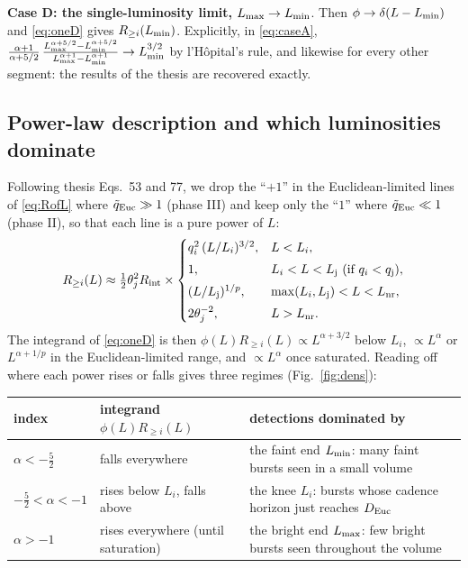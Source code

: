 \documentclass[11pt,a4paper]{article}
\newcommand{\tq}{\tilde{q}}
\newcommand{\Euc}{{\rm Euc}}
\newcommand{\Rint}{R_{\rm int}}
\newcommand{\Lmin}{L_{\rm min}}
\newcommand{\Lmax}{L_{\rm max}}
\newcommand{\Lj}{L_{\rm j}}
\newcommand{\Lnr}{L_{\rm nr}}
\begin{document}
\medskip\noindent\textbf{Case D: the single-luminosity limit,} $\Lmax\to\Lmin$. Then $\phi\to\delta(L-\Lmin)$ and \eqref{eq:oneD} gives $R_{\geq i}(\Lmin)$. Explicitly, in \eqref{eq:caseA}, $\frac{\alpha+1}{\alpha+5/2}\,\frac{\Lmax^{\alpha+5/2}-\Lmin^{\alpha+5/2}}{\Lmax^{\alpha+1}-\Lmin^{\alpha+1}}\to\Lmin^{3/2}$ by l'H\^opital's rule, and likewise for every other segment: the results of the thesis are recovered exactly.

\subsection{Power-law description and which luminosities dominate}
\label{sec:dominance}

Following thesis Eqs.~53 and 77, we drop the ``$+1$'' in the Euclidean-limited lines of \eqref{eq:RofL} where $\tq_\Euc\gg1$ (phase III) and keep only the ``$1$'' where $\tq_\Euc\ll1$ (phase II), so that each line is a pure power of $L$:
\begin{equation}
\label{eq:RofLpow}
R_{\geq i}(L)\approx\tfrac12\theta_j^2\Rint\times\begin{cases}
q_i^2\,(L/L_i)^{3/2}, & L<L_i,\\[3pt]
1, & L_i<L<\Lj\ (\text{if }q_i<q_{\rm j}),\\[3pt]
(L/\Lj)^{1/p}, & \max(L_i,\Lj)<L<\Lnr,\\[3pt]
2\theta_j^{-2}, & L>\Lnr .
\end{cases}
\end{equation}
The integrand of \eqref{eq:oneD} is then $\phi(L)R_{\geq i}(L)\propto L^{\alpha+3/2}$ below $L_i$, $\propto L^{\alpha}$ or $L^{\alpha+1/p}$ in the Euclidean-limited range, and $\propto L^{\alpha}$ once saturated. Reading off where each power rises or falls gives three regimes (Fig.~\ref{fig:dens}):

\begin{center}\small
\renewcommand{\arraystretch}{1.35}
\begin{tabular}{l l p{7.6cm}}
\toprule
index & integrand $\phi(L)R_{\geq i}(L)$ & detections dominated by \\
\midrule
$\alpha<-\tfrac52$ & falls everywhere & the faint end $\Lmin$: many faint bursts seen in a small volume \\
$-\tfrac52<\alpha<-1$ & rises below $L_i$, falls above & the knee $L_i$: bursts whose cadence horizon just reaches $D_\Euc$ \\
$\alpha>-1$ & rises everywhere (until saturation) & the bright end $\Lmax$: few bright bursts seen throughout the volume \\
\bottomrule
\end{tabular}
\end{center}
\end{document}
